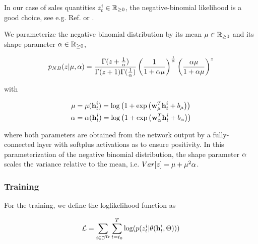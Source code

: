 \documentclass[11pt,headings=small]{scrartcl}
\begin{document}
In our case of sales quantities $z^{i}_{t}\in\mathbb R_{\ge 0}$, the negative-binomial likelihood is a good choice, see e.g. Ref. \cite{10.5555/3044805.3045048} or \cite{SNYDER2012485}.

We parameterize the negative binomial distribution by its mean $\mu\in\mathbb R_{\ge 0}$ and its shape parameter $\alpha\in\mathbb R_{\ge 0}$,

\begin{equation}\label{nonnegativebinomial}
p_{NB}(z|\mu,\alpha) = \frac{\Gamma(z + \frac{1}{\alpha})}{\Gamma(z + 1)\Gamma(\frac{1}{\alpha})}\left(\frac{1}{1+\alpha\mu}\right)^{\frac{1}{\alpha}}\left(\frac{\alpha\mu}{1+\alpha\mu}\right)^{z}
\end{equation}

with

\begin{subequations}\label{nonnegativebinomialparameters}
	\begin{align}
	\mu &= \mu(\textbf{h}_{t}^{i}) = \log\left(1 + \exp\left(\textbf{w}^{T}_{\mu}\textbf{h}_{t}^{i} + b_{\mu}\right)\right)\\
	\alpha &= \alpha(\textbf{h}_{t}^{i}) = \log\left(1 + \exp\left(\textbf{w}^{T}_{\alpha}\textbf{h}_{t}^{i} + b_{\alpha}\right)\right)
	\end{align}
\end{subequations}


where both parameters are obtained from the network output by a fully-connected layer with softplus activations as to ensure positivity. In this parameterization of the negative binomial distribution, the shape parameter $\alpha$ scales the variance relative to the mean, i.e. $Var[z] = \mu+\mu^{2}\alpha$.

\subsubsection{Training}
\label{subsubsection:App1Training}
For the training, we define the loglikelihood function as

\begin{equation}\label{loglikelihood}
\mathcal{L} = \sum_{i\in\frak{I}^{\text{Tr}}}\sum_{t=t_{0}}^{T}\log(p(z^{i}_{t} | \theta(\textbf{h}_{t}^{i},\Theta)))
\end{equation}
\end{document}
